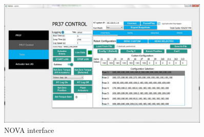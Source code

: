 \begin{figure}
	\begin{center}
		\includegraphics[width=0.9\textwidth]{./images/NOVA.JPG}%
		\caption{NOVA interface}
		\label{fig:nova}%
	\end{center}
\end{figure}
